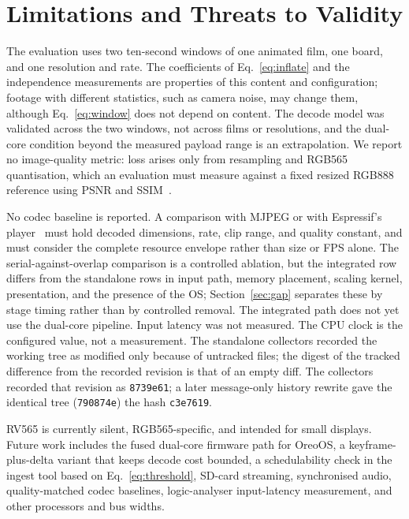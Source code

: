 \documentclass[11pt,twocolumn]{article}
\newcommand{\system}{RV565}
\begin{document}
\section{Limitations and Threats to Validity}

The evaluation uses two ten-second windows of one animated film, one board,
and one resolution and rate.  The coefficients of Eq.~\eqref{eq:inflate} and
the independence measurements are properties of this content and
configuration; footage with different statistics, such as camera noise, may
change them, although Eq.~\eqref{eq:window} does not depend on content.  The
decode model was validated across the two windows, not across films or
resolutions, and the dual-core condition beyond the measured payload range is
an extrapolation.  We report no image-quality metric: loss arises only from
resampling and RGB565 quantisation, which an evaluation must measure against
a fixed resized RGB888 reference using PSNR and SSIM~\cite{wang2004image}.

No codec baseline is reported.  A comparison with MJPEG or with Espressif's
player~\cite{espressif2026player} must hold decoded dimensions, rate, clip
range, and quality constant, and must consider the complete resource envelope
rather than size or FPS alone.  The serial-against-overlap comparison is a
controlled ablation, but the integrated row differs from the standalone rows
in input path, memory placement, scaling kernel, presentation, and the
presence of the OS; Section~\ref{sec:gap} separates these by stage timing
rather than by controlled removal.  The integrated path does not yet use the
dual-core pipeline.  Input latency was not measured.  The CPU clock is the
configured value, not a measurement.  The standalone collectors recorded the
working tree as modified only because of untracked files; the digest of the
tracked difference from the recorded revision is that of an empty diff.  The
collectors recorded that revision as \texttt{8739e61}; a later message-only
history rewrite gave the identical tree (\texttt{790874e}) the hash
\texttt{c3e7619}.

\system{} is currently silent, RGB565-specific, and intended for small
displays.  Future work includes the fused dual-core firmware path for OreoOS,
a keyframe-plus-delta variant that keeps decode cost bounded, a
schedulability check in the ingest tool based on Eq.~\eqref{eq:threshold},
SD-card streaming, synchronised audio, quality-matched codec baselines,
logic-analyser input-latency measurement, and other processors and bus
widths.
\end{document}
